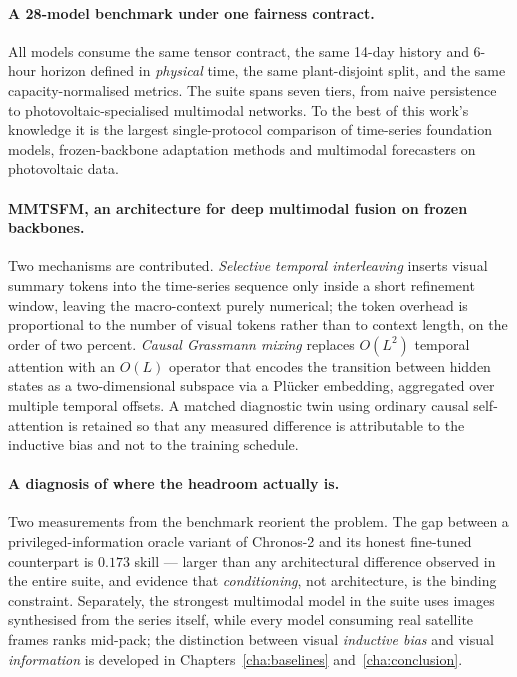 \paragraph{A 28-model benchmark under one fairness contract.}
All models consume the same tensor contract, the same 14-day history and 6-hour horizon
defined in \emph{physical} time, the same plant-disjoint split, and the same
capacity-normalised metrics. The suite spans seven tiers, from naive persistence to
photovoltaic-specialised multimodal networks. To the best of this work's knowledge it is
the largest single-protocol comparison of time-series foundation models,
frozen-backbone adaptation methods and multimodal forecasters on photovoltaic data.

\paragraph{MMTSFM, an architecture for deep multimodal fusion on frozen backbones.}
Two mechanisms are contributed. \emph{Selective temporal interleaving} inserts visual
summary tokens into the time-series sequence only inside a short refinement window, leaving
the macro-context purely numerical; the token overhead is proportional to the number of
visual tokens rather than to context length, on the order of two percent. \emph{Causal
Grassmann mixing} replaces $O(L^2)$ temporal attention with an $O(L)$ operator that encodes
the transition between hidden states as a two-dimensional subspace via a Pl\"ucker embedding,
aggregated over multiple temporal offsets. A matched diagnostic twin using ordinary causal
self-attention is retained so that any measured difference is attributable to the inductive
bias and not to the training schedule.

\paragraph{A diagnosis of where the headroom actually is.}
Two measurements from the benchmark reorient the problem. The gap between a
privileged-information oracle variant of Chronos-2 and its honest fine-tuned counterpart is
$0.173$ skill --- larger than any architectural difference observed in the entire suite,
and evidence that \emph{conditioning}, not architecture, is the binding constraint.
Separately, the strongest multimodal model in the suite uses images synthesised from the
series itself, while every model consuming real satellite frames ranks mid-pack; the
distinction between visual \emph{inductive bias} and visual \emph{information} is developed
in Chapters~\ref{cha:baselines} and~\ref{cha:conclusion}.

